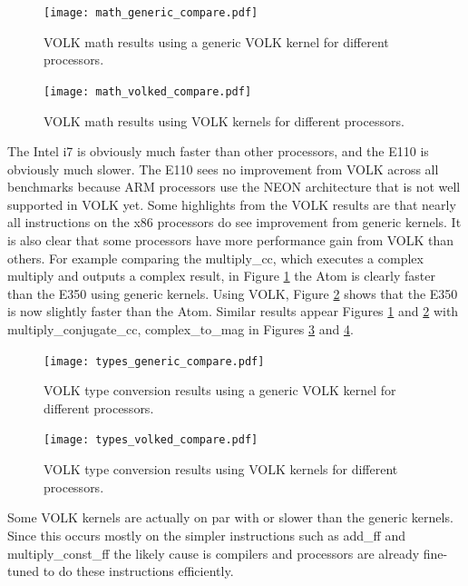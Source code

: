 \documentclass[english]{article}
\begin{document}
\begin{figure}[htbp]
    \centering
    \texttt{[image: math\_generic\_compare.pdf]}
    \caption{VOLK math results using a generic VOLK kernel for different processors.}
    \label{fig:math_generic_compare}
\end{figure}

\begin{figure}[htbp]
    \centering
    \texttt{[image: math\_volked\_compare.pdf]}
    \caption{VOLK math results using VOLK kernels for different processors.}
    \label{fig:math_volk_compare}
\end{figure}

The Intel i7 is obviously much faster than other processors, and the E110 is obviously much slower. 
The E110 sees no improvement from VOLK across all benchmarks because ARM processors use the NEON architecture that is not well supported in VOLK yet.
Some highlights from the VOLK results are that nearly all instructions on the x86 processors do see improvement from generic kernels. 
It is also clear that some processors have more performance gain from VOLK than others. 
For example comparing the multiply\_cc, which executes a complex multiply and outputs a complex result, in Figure \ref{fig:math_generic_compare} the Atom is clearly faster than the E350 using generic kernels.
Using VOLK, Figure \ref{fig:math_volk_compare} shows that the E350 is now slightly faster than the Atom. 
Similar results appear Figures \ref{fig:math_generic_compare} and \ref{fig:math_volk_compare} with multiply\_conjugate\_cc, complex\_to\_mag in Figures \ref{fig:type_generic_compare} and \ref{fig:type_volk_compare}. 

\begin{figure}[htbp]
    \centering
    \texttt{[image: types\_generic\_compare.pdf]}
    \caption{VOLK type conversion results using a generic VOLK kernel for different processors.}
    \label{fig:type_generic_compare}
\end{figure}

\begin{figure}[htbp]
    \centering
    \texttt{[image: types\_volked\_compare.pdf]}
    \caption{VOLK type conversion results using VOLK kernels for different processors.}
    \label{fig:type_volk_compare}
\end{figure}

Some VOLK kernels are actually on par with or slower than the generic kernels. 
Since this occurs mostly on the simpler instructions such as add\_ff and multiply\_const\_ff the likely cause is compilers and processors are already fine-tuned to do these instructions efficiently. 
\end{document}

